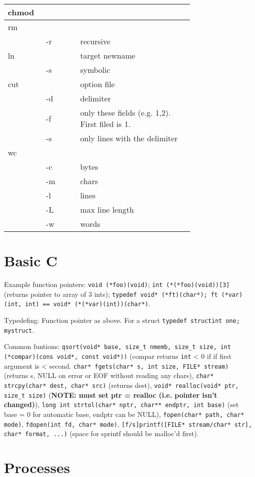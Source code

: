 \documentclass[a4]{article}
\begin{document}
\begin{multicols*}{3}
\begin{tabular}{>{\ttfamily}p{0.1\linewidth}>{\ttfamily}p{0.15\linewidth}p{0.5\linewidth}}
			chmod & & \\\hline
			rm & & \\\hline
			   & -r & recursive\\
			ln & & target newname\\\hline
			   & -s & symbolic\\
			cut & & option file\\\hline
				& -d & delimiter\\
				& -f & only these fields (e.g. 1,2). First filed is 1.\\
				& -s & only lines with the delimiter\\
			wc & & \\\hline
			 & -c & bytes\\
			 & -m & chars\\
			 & -l & lines\\
			 & -L & max line length\\
			 & -w & words\\
	\end{tabular}

	\section{Basic C}
	\label{sec:basic_c}
	
	Example function pointers: \texttt{void (*foo)(void)}; \texttt{int (*(*foo)(void))[3]} (returns pointer to array of 3 ints); \texttt{typedef void* (*ft)(char*); ft (*var)(int, int) == void* (*(*var)(int))(char*)}.

	Typedefing: Function pointer as above. For a struct \texttt{typedef struct{int one;} mystruct}.

	Common funtions: \texttt{qsort(void* base, size\_t nmemb, size\_t size, int (*compar)(cons void*, const void*))} (compar returns \texttt{int} < 0 if if first argument is < second. \texttt{char* fgets(char* s, int size, FILE* stream)} (returns s, NULL on error or EOF without reading any chars), \texttt{char* strcpy(char* dest, char* src)} (returns dest), \texttt{void* realloc(void* ptr, size\_t size)} (\textbf{NOTE: must set ptr = realloc (i.e. pointer isn't changed)}), \texttt{long int strtol(char* nptr, char** endptr, int base)} (set base = 0 for automatic base, endptr can be NULL), \texttt{fopen(char* path, char* mode)}, \texttt{fdopen(int fd, char* mode)}, \texttt{[f/s]printf([FILE* stream/char* str], char* format, ...)} (space for sprintf should be malloc'd first).

	\section{Processes}
	\label{sec:processes}


\end{multicols*}
\end{document}
